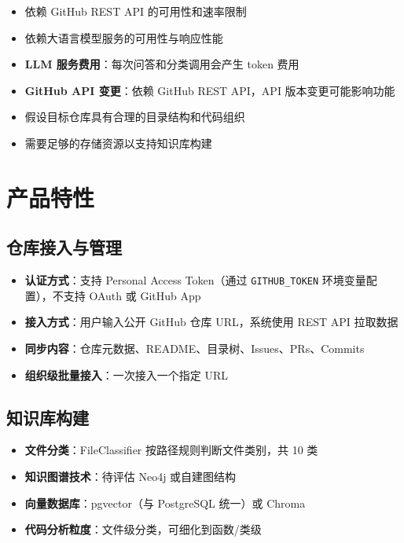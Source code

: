 \documentclass[10pt,a4paper]{article}
\begin{document}
\begin{itemize}
    \item 依赖 GitHub REST API 的可用性和速率限制
    \item 依赖大语言模型服务的可用性与响应性能
    \item \textbf{LLM 服务费用}：每次问答和分类调用会产生 token 费用
    \item \textbf{GitHub API 变更}：依赖 GitHub REST API，API 版本变更可能影响功能
    \item 假设目标仓库具有合理的目录结构和代码组织
    \item 需要足够的存储资源以支持知识库构建
\end{itemize}

\section{产品特性}

\subsection{仓库接入与管理}

\begin{itemize}
    \item \textbf{认证方式}：支持 Personal Access Token（通过 \texttt{GITHUB\_TOKEN} 环境变量配置），不支持 OAuth 或 GitHub App
    \item \textbf{接入方式}：用户输入公开 GitHub 仓库 URL，系统使用 REST API 拉取数据
    \item \textbf{同步内容}：仓库元数据、README、目录树、Issues、PRs、Commits
    \item \textbf{组织级批量接入}：一次接入一个指定 URL
\end{itemize}

\subsection{知识库构建}

\begin{itemize}
    \item \textbf{文件分类}：FileClassifier 按路径规则判断文件类别，共 10 类
    \item \textbf{知识图谱技术}：待评估 Neo4j 或自建图结构
    \item \textbf{向量数据库}：pgvector（与 PostgreSQL 统一）或 Chroma
    \item \textbf{代码分析粒度}：文件级分类，可细化到函数/类级
\end{itemize}
\end{document}
